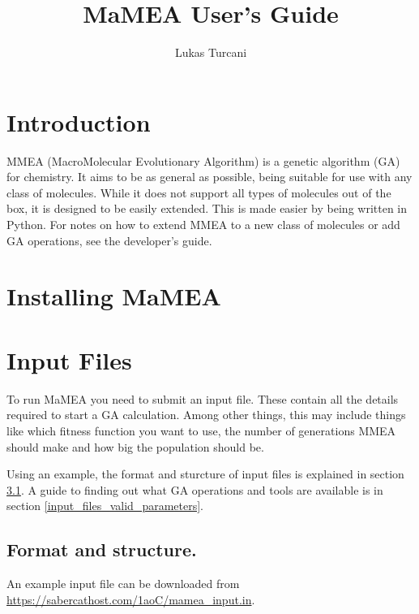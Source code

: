 \documentclass{article}
\title{MaMEA User's Guide}
\author{Lukas Turcani}
\begin{document}
\begin{titlepage}
	\maketitle
\end{titlepage}

\tableofcontents
\newpage
\section{Introduction}
MMEA (MacroMolecular Evolutionary Algorithm) is a genetic algorithm (GA) for chemistry. It aims to be as general as possible, being suitable for use with any class of molecules. While it does not support all types of molecules out of the box, it is designed to be easily extended. This is made easier by being written in Python. For notes on how to extend MMEA to a new class of molecules or add GA operations, see the developer's guide.

\section{Installing MaMEA}

\section{Input Files}

To run MaMEA you need to submit an input file. These contain all the details required to start a GA calculation. Among other things, this may include things like which fitness function you want to use, the number of generations MMEA should make and how big the population should be.

Using an example, the format and sturcture of input files is explained in section \ref{input_files_format_and_structure}. A guide to finding out what GA operations and tools are available is in section \ref{input_files_valid_parameters}.

\subsection{Format and structure.}
\label{input_files_format_and_structure}

An example input file can be downloaded from \url{https://sabercathost.com/1aoC/mamea_input.in}.
\end{document}
